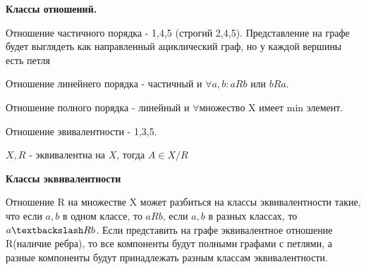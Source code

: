 \textbf{Классы отношений.}

Отношение частичного порядка - 1,4,5 (строгий 2,4,5). Представление на графе будет выглядеть как направленный ациклический граф, но у каждой вершины есть петля

Отношение линейнего порядка - частичный и $\forall a,b: aRb$ или $bRa$.

Отношение полного порядка - линейный и $\forall $множество X имеет min элемент.

Отношение эвивалентности - 1,3,5.

$X,R$ - эквивалентна на $X$, тогда $A\in X /R$

\textbf{Классы эквивалентности}

Отношение R на множестве X может разбиться на классы эквивалентности такие, что если $a, b$ в одном классе, то  $aRb$, если $a, b$ в разных классах, то $a\textbackslash Rb$. Если представить на графе эквивалентное отношение R(наличие ребра), то все компоненты будут полными графами с петлями, а разные компоненты будут принадлежать разным классам эквивалентности.
